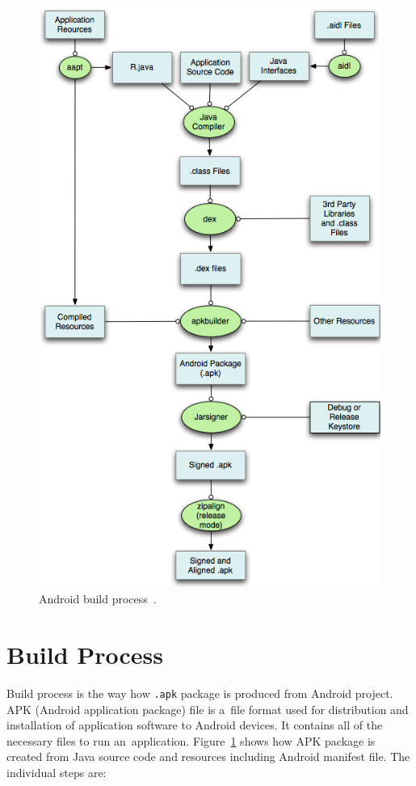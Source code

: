\begin{figure}[h!]
    \centering
    \includegraphics[scale=0.5]{fig/build.png}
    \caption{Android build process~\cite{AndroidDev}.}
    \label{BuildProcessFigure}
\end{figure}

\section{Build Process}\label{BuildProcessSection}
Build process is the way how \texttt{.apk} package is produced from Android project. APK (Android application package)
file is a~file format used for distribution and installation of application software to Android devices. It contains all
of the necessary files to run an~application. Figure~\ref{BuildProcessFigure} shows how APK package is created from
Java source code and resources including Android manifest file. The individual steps are:

